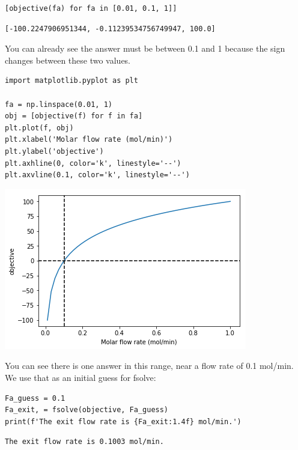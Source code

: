 \documentclass[11pt]{article}
\begin{document}
\begin{verbatim}
[objective(fa) for fa in [0.01, 0.1, 1]]
\end{verbatim}

\begin{verbatim}
[-100.2247906951344, -0.11239534756749947, 100.0]
\end{verbatim}

You can already see the answer must be between 0.1 and 1 because the sign changes between these two values.

\begin{verbatim}
import matplotlib.pyplot as plt

fa = np.linspace(0.01, 1)
obj = [objective(f) for f in fa]
plt.plot(f, obj)
plt.xlabel('Molar flow rate (mol/min)')
plt.ylabel('objective')
plt.axhline(0, color='k', linestyle='--')
plt.axvline(0.1, color='k', linestyle='--')
\end{verbatim}

\begin{center}
\includegraphics[width=.9\linewidth]{obipy-resources/a42b059ba3fd2f94b3a34f1c9b427f54-26729u2c.png}
\end{center}


You can see there is one answer in this range, near a flow rate of 0.1 mol/min. We use that as an initial guess for fsolve:

\begin{verbatim}
Fa_guess = 0.1
Fa_exit, = fsolve(objective, Fa_guess)
print(f'The exit flow rate is {Fa_exit:1.4f} mol/min.')
\end{verbatim}

\begin{verbatim}
The exit flow rate is 0.1003 mol/min.

\end{verbatim}
\end{document}
